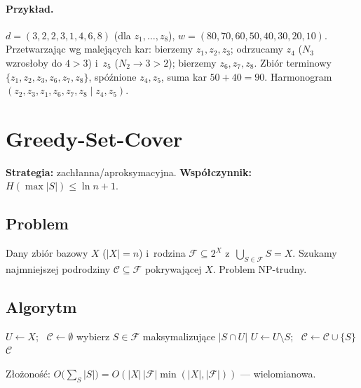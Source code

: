 \documentclass[11pt,a4paper]{article}
\theoremstyle{plain}
\theoremstyle{definition}
\begin{document}
\paragraph{Przykład.} $d=(3,2,2,3,1,4,6,8)$ (dla $z_1{,}\dots{,}z_8$), $w=(80,70,60,50,40,30,20,10)$.
Przetwarzając wg malejących kar: bierzemy $z_1,z_2,z_3$; odrzucamy $z_4$ ($N_3$ wzrosłoby do $4>3$) i~$z_5$
($N_2\!\to\!3>2$); bierzemy $z_6,z_7,z_8$. Zbiór terminowy $\{z_1,z_2,z_3,z_6,z_7,z_8\}$, spóźnione $z_4,z_5$,
suma kar $50+40=90$. Harmonogram $(z_2,z_3,z_1,z_6,z_7,z_8\mid z_4,z_5)$.

\section{Greedy-Set-Cover}\label{sec:setcover}
\textbf{Strategia:} zachłanna/aproksymacyjna. \quad\textbf{Współczynnik:} $H(\max|S|)\le \ln n+1$.

\subsection*{Problem}
Dany zbiór bazowy $X$ ($|X|=n$) i~rodzina $\mathcal F\subseteq 2^X$ z~$\bigcup_{S\in\mathcal F}S=X$.
Szukamy najmniejszej podrodziny $\mathcal C\subseteq\mathcal F$ pokrywającej $X$. Problem NP\hbox{-}trudny.

\subsection*{Algorytm}
\begin{algorithm}[H]
\caption{Greedy-Set-Cover($X,\mathcal F$)}
\begin{algorithmic}[1]
\State $U\gets X$; \ $\mathcal C\gets\emptyset$
  \State wybierz $S\in\mathcal F$ maksymalizujące $|S\cap U|$ 
  \State $U\gets U\setminus S$; \ $\mathcal C\gets\mathcal C\cup\{S\}$
\EndWhile
\State \Return $\mathcal C$
\end{algorithmic}
\end{algorithm}
Złożoność: $O\big(\sum_{S}|S|\big)=O(|X|\,|\mathcal F|\min(|X|,|\mathcal F|))$ --- wielomianowa.
\end{document}
